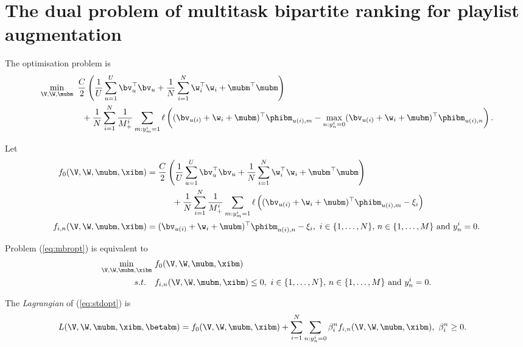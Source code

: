 \section{The dual problem of multitask bipartite ranking for playlist augmentation}

The optimisation problem is
\begin{equation}
\label{eq:mbropt}
\begin{aligned}
&\min_{\V, \W, \mubm} \ \frac{C}{2} \left( \frac{1}{U} \sum_{u=1}^U \bv_u^\top \bv_u 
     + \frac{1}{N} \sum_{i=1}^N \w_i^\top \w_i + \mubm^\top \mubm \right) \\
& \hspace{5em}
     + \frac{1}{N} \sum_{i=1}^N \frac{1}{M_+^i} \sum_{m: y_m^i = 1} \ell \left( (\bv_{u(i)} + \w_i + \mubm)^\top \phibm_{u(i),m} 
     - \max_{n: y_n^i = 0} (\bv_{u(i)} + \w_i + \mubm)^\top \phibm_{u(i),n} \right).
\end{aligned}
\end{equation}

Let 
\begin{equation*}
\begin{aligned}
f_0(\V, \W, \mubm, \xibm) &= \frac{C}{2} \left( \frac{1}{U} \sum_{u=1}^U \bv_u^\top \bv_u 
     + \frac{1}{N} \sum_{i=1}^N \w_i^\top \w_i + \mubm^\top \mubm \right) \\
& \hspace{3em} 
     + \frac{1}{N} \sum_{i=1}^N \frac{1}{M_+^i} \sum_{m: y_m^i = 1} 
       \ell \left( (\bv_{u(i)} + \w_i + \mubm)^\top \phibm_{u(i),m} - \xi_i \right) \\
f_{i,n} (\V, \W, \mubm, \xibm) &= (\bv_{u(i)} + \w_i + \mubm)^\top \phibm_{u(i),n} - \xi_i, \
i \in \{1,\dots,N\}, \, n \in \{1,\dots,M\} \ \mathrm{and} \ y_n^i = 0.
\end{aligned}
\end{equation*}

Problem (\ref{eq:mbropt}) is equivalent to 
\begin{equation}
\label{eq:stdopt}
\begin{aligned}
\min_{\V, \W, \mubm, \xibm} \ & f_0(\V, \W, \mubm, \xibm) \\
s.t. \quad & f_{i,n}(\V, \W, \mubm, \xibm) \le 0, \
i \in \{1,\dots,N\}, \, n \in \{1,\dots,M\} \ \mathrm{and} \ y_n^i = 0.
\end{aligned}
\end{equation}

The \emph{Lagrangian} of (\ref{eq:stdopt}) is
\begin{equation*}
\begin{aligned}
L(\V, \W, \mubm, \xibm, \betabm) 
&= f_0(\V, \W, \mubm, \xibm) + \sum_{i=1}^N \sum_{n: y_n^i = 0} \beta_i^n f_{i,n} (\V, \W, \mubm, \xibm), \
\beta_i^n \ge 0.
\end{aligned}
\end{equation*}

